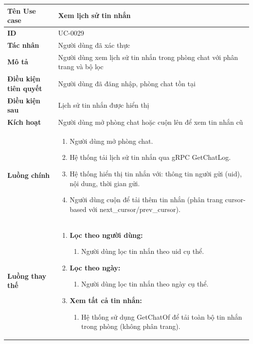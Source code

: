 {
\renewcommand{\arraystretch}{1.5}

\begin{tabularx}{\textwidth}{|>{\raggedright\arraybackslash}X|>{\raggedright\arraybackslash}X|}
\hline
\textbf{Tên Use case} & Xem lịch sử tin nhắn \\
\hline
\textbf{ID} & UC-0029 \\
\hline
\textbf{Tác nhân} & Người dùng đã xác thực \\
\hline
\textbf{Mô tả} & Người dùng xem lịch sử tin nhắn trong phòng chat với phân trang và bộ lọc \\
\hline
\textbf{Điều kiện tiên quyết} & Người dùng đã đăng nhập, phòng chat tồn tại \\
\hline
\textbf{Điều kiện sau} & Lịch sử tin nhắn được hiển thị \\
\hline
\textbf{Kích hoạt} & Người dùng mở phòng chat hoặc cuộn lên để xem tin nhắn cũ \\
\hline
\textbf{Luồng chính} &
\begin{enumerate}
    \item Người dùng mở phòng chat.
    \item Hệ thống tải lịch sử tin nhắn qua gRPC GetChatLog.
    \item Hệ thống hiển thị tin nhắn với: thông tin người gửi (uid), nội dung, thời gian gửi.
    \item Người dùng cuộn để tải thêm tin nhắn (phân trang cursor-based với next\_cursor/prev\_cursor).
\end{enumerate} \\
\hline
\textbf{Luồng thay thế} &
\begin{enumerate}
    \item \textbf{Lọc theo người dùng:}
    \begin{enumerate}
        \item[2A.] Người dùng lọc tin nhắn theo uid cụ thể.
    \end{enumerate}
    \item \textbf{Lọc theo ngày:}
    \begin{enumerate}
        \item[2B.] Người dùng lọc tin nhắn theo ngày cụ thể.
    \end{enumerate}
    \item \textbf{Xem tất cả tin nhắn:}
    \begin{enumerate}
        \item[2C.] Hệ thống sử dụng GetChatOf để tải toàn bộ tin nhắn trong phòng (không phân trang).

\end{enumerate}
\end{enumerate}
\end{tabularx}}
